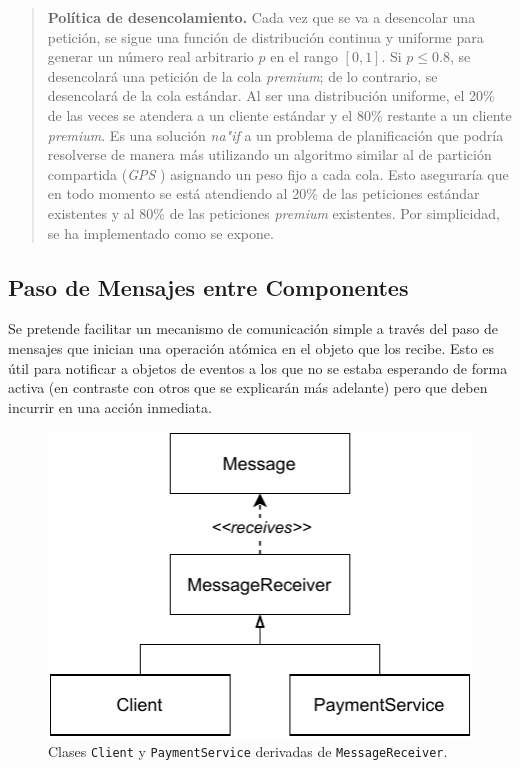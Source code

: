 \documentclass[a4paper]{article}
\begin{document}
	\begin{quotation}
		\textbf{Política de desencolamiento.} Cada vez que se va a desencolar una petición, se sigue una función de distribución continua y uniforme para generar un número real arbitrario $p$ en el rango $[0, 1]$. Si $p\leq0.8$, se desencolará una petición de la cola \textit{premium}; de lo contrario, se desencolará de la cola estándar. Al ser una distribución uniforme, el 20\% de las veces se atendera a un cliente estándar y el 80\% restante a un cliente \textit{premium}. Es una solución \textit{na"if} a un problema de planificación que podría resolverse de manera más utilizando un algoritmo similar al de partición compartida (\textit{GPS} \cite{gps}) asignando un peso fijo a cada cola. Esto aseguraría que en todo momento se está atendiendo al 20\% de las peticiones estándar existentes y al 80\% de las peticiones \textit{premium} existentes. Por simplicidad, se ha implementado como se expone.
	\end{quotation}
	
	\subsection{Paso de Mensajes entre Componentes}
	Se pretende facilitar un mecanismo de comunicación simple a través del paso de mensajes que inician una operación atómica en el objeto que los recibe. Esto es útil para notificar a objetos de eventos a los que no se estaba esperando de forma activa (en contraste con otros que se explicarán más adelante) pero que deben incurrir en una acción inmediata.
	
	\begin{figure}[h]
		\centering
		\includegraphics[scale=0.8]{figures/message_receivers.pdf}
		\caption{Clases \texttt{Client} y \texttt{PaymentService} derivadas de \texttt{MessageReceiver}.}
	\end{figure}
	
\end{document}
